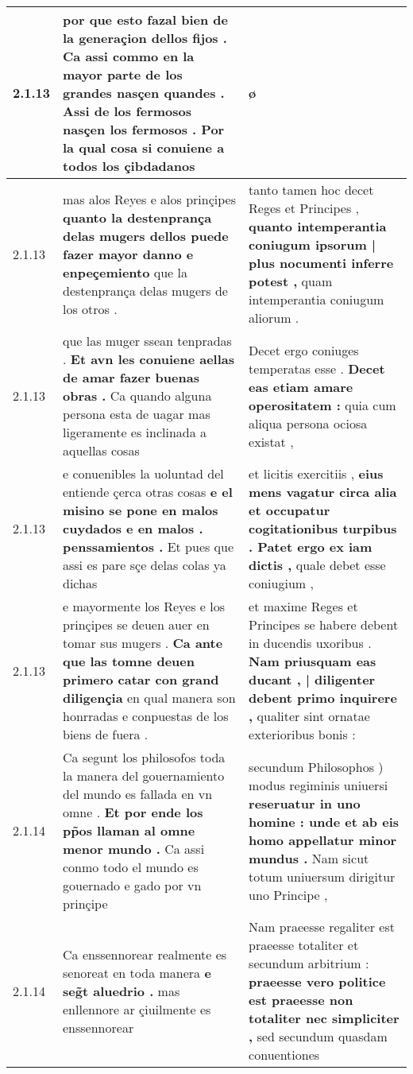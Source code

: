 \begin{tabular}{|p{1cm}|p{6.5cm}|p{6.5cm}|}
2.1.13 & por que esto fazal bien de la generaçion dellos fijos . \textbf{ Ca assi commo en la mayor parte de los grandes nasçen quandes . } Assi de los fermosos nasçen los fermosos . Por la qual cosa si conuiene a todos los çibdadanos & ø \\\hline
2.1.13 & mas alos Reyes e alos prinçipes \textbf{ quanto la destenprança delas mugers dellos puede fazer mayor danno e enpeçemiento } que la destenprança delas mugers de los otros . & tanto tamen hoc decet Reges et Principes , \textbf{ quanto intemperantia coniugum ipsorum | plus nocumenti inferre potest , } quam intemperantia coniugum aliorum . \\\hline
2.1.13 & que las muger ssean tenpradas . \textbf{ Et avn les conuiene aellas de amar fazer buenas obras . } Ca quando alguna persona esta de uagar mas ligeramente es inclinada a aquellas cosas & Decet ergo coniuges temperatas esse . \textbf{ Decet eas etiam amare operositatem : } quia cum aliqua persona ociosa existat , \\\hline
2.1.13 & e conuenibles la uoluntad del entiende çerca otras cosas \textbf{ e el misino se pone en malos cuydados e en malos . penssamientos . } Et pues que assi es pare sçe delas colas ya dichas & et licitis exercitiis , \textbf{ eius mens vagatur circa alia et occupatur cogitationibus turpibus . Patet ergo ex iam dictis , } quale debet esse coniugium , \\\hline
2.1.13 & e mayormente los Reyes e los prinçipes se deuen auer en tomar sus mugers . \textbf{ Ca ante que las tomne deuen primero catar con grand diligençia } en qual manera son honrradas e conpuestas de los biens de fuera . & et maxime Reges et Principes se habere debent in ducendis uxoribus . \textbf{ Nam priusquam eas ducant , | diligenter debent primo inquirere , } qualiter sint ornatae exterioribus bonis : \\\hline
2.1.14 & Ca segunt los philosofos toda la manera del gouernamiento del mundo es fallada en vn omne . \textbf{ Et por ende los pp̃os llaman al omne menor mundo . } Ca assi conmo todo el mundo es gouernado e gado por vn prinçipe & secundum Philosophos ) modus regiminis uniuersi \textbf{ reseruatur in uno homine : unde et ab eis homo appellatur minor mundus . } Nam sicut totum uniuersum dirigitur uno Principe , \\\hline
2.1.14 & Ca enssennorear realmente es senoreat en toda manera \textbf{ e seg̃t aluedrio . } mas enllennore ar çiuilmente es enssennorear & Nam praeesse regaliter est praeesse totaliter et secundum arbitrium : \textbf{ praeesse vero politice est praeesse non totaliter nec simpliciter , } sed secundum quasdam conuentiones \\\hline

\end{tabular}
